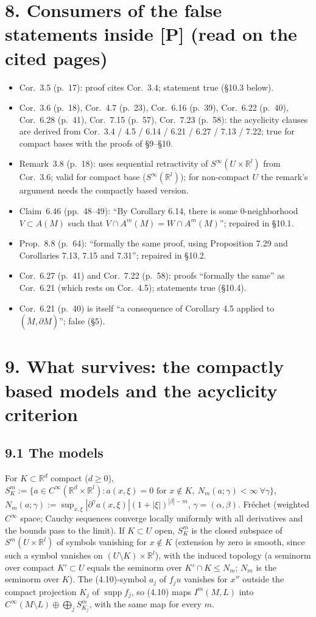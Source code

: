 \documentclass[11pt]{article}
\newcommand{\R}{\mathbb{R}}
\newcommand{\supp}{\operatorname{supp}}
\newcommand{\Mb}{\breve{M}}
\begin{document}
\section*{8. Consumers of the false statements inside [P] (read on the cited pages)}
\begin{itemize}
\item Cor.~3.5 (p.~17): proof cites Cor.~3.4; statement true (\S10.3 below).
\item Cor.~3.6 (p.~18), Cor.~4.7 (p.~23), Cor.~6.16 (p.~39), Cor.~6.22 (p.~40), Cor.~6.28 (p.~41), Cor.~7.15 (p.~57), Cor.~7.23 (p.~58): the acyclicity clauses are derived from Cor.~3.4 / 4.5 / 6.14 / 6.21 / 6.27 / 7.13 / 7.22; true for compact bases with the proofs of \S9--\S10.
\item Remark~3.8 (p.~18): uses sequential retractivity of $S^\infty(U\times\R^l)$ from Cor.~3.6; valid for compact base ($S^\infty(\R^l)$); for non-compact $U$ the remark's argument needs the compactly based version.
\item Claim~6.46 (pp.~48--49): ``By Corollary 6.14, there is some 0-neighborhood $V\subset A(M)$ such that $V\cap A^m(M)=W\cap A^m(M)$''; repaired in \S10.1.
\item Prop.~8.8 (p.~64): ``formally the same proof, using Proposition 7.29 and Corollaries 7.13, 7.15 and 7.31''; repaired in \S10.2.
\item Cor.~6.27 (p.~41) and Cor.~7.22 (p.~58): proofs ``formally the same'' as Cor.~6.21 (which rests on Cor.~4.5); statements true (\S10.4).
\item Cor.~6.21 (p.~40) is itself ``a consequence of Corollary 4.5 applied to $(\Mb,\partial M)$''; false (\S5).
\end{itemize}

\section*{9. What survives: the compactly based models and the acyclicity criterion}
\subsection*{9.1 The models}
For $K\subset\R^d$ compact ($d\ge0$), $S^m_K:=\{a\in C^\infty(\R^d\times\R^l):a(x,\xi)=0\text{ for }x\notin K,\ N_m(a;\gamma)<\infty\ \forall\gamma\}$, $N_m(a;\gamma):=\sup_{x,\xi}|\partial^\gamma a(x,\xi)|(1+|\xi|)^{|\beta|-m}$, $\gamma=(\alpha,\beta)$. Fr\'echet (weighted $C^\infty$ space; Cauchy sequences converge locally uniformly with all derivatives and the bounds pass to the limit). If $K\subset U$ open, $S^m_K$ is the closed subspace of $S^m(U\times\R^l)$ of symbols vanishing for $x\notin K$ (extension by zero is smooth, since such a symbol vanishes on $(U\setminus K)\times\R^l$), with the induced topology (a seminorm over compact $K'\subset U$ equals the seminorm over $K'\cap K\le N_m$; $N_m$ is the seminorm over $K$). The (4.10)-symbol $a_j$ of $f_ju$ vanishes for $x''$ outside the compact projection $K_j$ of $\supp f_j$, so (4.10) maps $I^m(M,L)$ into $C^\infty(M\setminus L)\oplus\bigoplus_jS^{\bar m}_{K_j}$, with the same map for every $m$.
\end{document}
